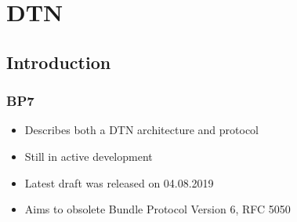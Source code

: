 \section{\acf{DTN}}

\subsection{Introduction}

\begin{frame}
  \frametitle{\acf{BP7}}

  \begin{itemize}
  \item Describes both a \acs{DTN} architecture and protocol
  \item Still in active development
  \item Latest draft was released on 04.08.2019
  \item Aims to obsolete Bundle Protocol Version 6, RFC 5050
  \end{itemize}
\end{frame}
